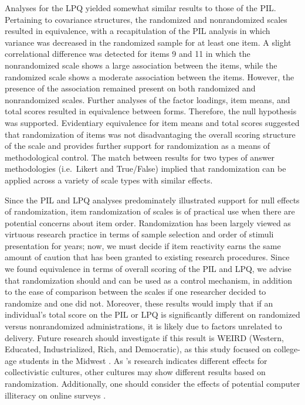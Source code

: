 \documentclass[english,man, mask]{apa6}
\theoremstyle{definition}
\theoremstyle{definition}
\theoremstyle{definition}
\theoremstyle{remark}
\begin{document}
Analyses for the LPQ yielded somewhat similar results to those of the
PIL. Pertaining to covariance structures, the randomized and
nonrandomized scales resulted in equivalence, with a recapitulation of
the PIL analysis in which variance was decreased in the randomized
sample for at least one item. A slight correlational difference was
detected for items 9 and 11 in which the nonrandomized scale shows a
large association between the items, while the randomized scale shows a
moderate association between the items. However, the presence of the
association remained present on both randomized and nonrandomized
scales. Further analyses of the factor loadings, item means, and total
scores resulted in equivalence between forms. Therefore, the null
hypothesis was supported. Evidentiary equivalence for item means and
total scores suggested that randomization of items was not
disadvantaging the overall scoring structure of the scale and provides
further support for randomization as a means of methodological control.
The match between results for two types of answer methodologies
(i.e.~Likert and True/False) implied that randomization can be applied
across a variety of scale types with similar effects.

Since the PIL and LPQ analyses predominately illustrated support for
null effects of randomization, item randomization of scales is of
practical use when there are potential concerns about item order.
Randomization has been largely viewed as virtuous research practice in
terms of sample selection and order of stimuli presentation for years;
now, we must decide if item reactivity earns the same amount of caution
that has been granted to existing research procedures. Since we found
equivalence in terms of overall scoring of the PIL and LPQ, we advise
that randomization should and can be used as a control mechanism, in
addition to the ease of comparison between the scales if one researcher
decided to randomize and one did not. Moreover, these results would
imply that if an individual's total score on the PIL or LPQ is
significantly different on randomized versus nonrandomized
administrations, it is likely due to factors unrelated to delivery.
Future research should investigate if this result is WEIRD (Western,
Educated, Industrialized, Rich, and Democratic), as this study focused
on college-age students in the Midwest \autocite{Henrich2010}. As
\textcite{Fang2012}'s research indicates different effects for
collectivistic cultures, other cultures may show different results based
on randomization. Additionally, one should consider the effects of
potential computer illiteracy on online surveys \autocite{Charters2004}.
\end{document}
